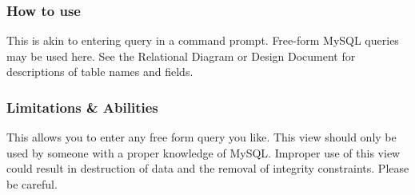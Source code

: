 \documentclass[letter]{article}
\begin{document}
\subsubsection{How to use}
This is akin to entering query in a command prompt. Free-form MySQL queries may be used here. See the Relational Diagram or Design Document for descriptions of table names and fields.

\subsubsection{Limitations \& Abilities}
This allows you to enter any free form query you like. This view should only be used by someone with a proper knowledge of MySQL. Improper use of this view could result in destruction of data and the removal of integrity constraints. Please be careful.


\end{document}
